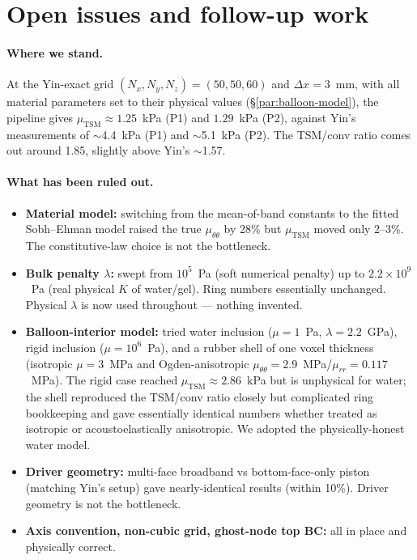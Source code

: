 \documentclass[11pt,letterpaper]{article}
\begin{document}
\section{Open issues and follow-up work}
\label{sec:openissues}

\paragraph{Where we stand.}
At the Yin-exact grid $(N_x, N_y, N_z) = (50, 50, 60)$ and
$\Delta x = 3$~mm, with all material parameters set to their
physical values (\S\ref{par:balloon-model}), the pipeline gives
$\mu_{\mathrm{TSM}} \approx 1.25$~kPa (P1) and $1.29$~kPa (P2),
against Yin's measurements of $\sim$4.4~kPa (P1) and $\sim$5.1~kPa
(P2). The TSM/conv ratio comes out around 1.85, slightly above
Yin's $\sim$1.57.

\paragraph{What has been ruled out.}
\begin{itemize}
\item \textbf{Material model:} switching from the mean-of-band constants
      to the fitted Sobh--Ehman model raised the true $\mu_{\theta\theta}$
      by 28\% but $\mu_{\mathrm{TSM}}$ moved only 2--3\%. The
      constitutive-law choice is not the bottleneck.
\item \textbf{Bulk penalty $\lambda$:} swept from $10^{5}$~Pa (soft
      numerical penalty) up to $2.2 \times 10^{9}$~Pa (real physical
      $K$ of water/gel). Ring numbers essentially unchanged. Physical
      $\lambda$ is now used throughout — nothing invented.
\item \textbf{Balloon-interior model:} tried water inclusion
      ($\mu = 1$~Pa, $\lambda = 2.2$~GPa), rigid inclusion
      ($\mu = 10^{6}$~Pa), and a rubber shell of one voxel thickness
      (isotropic $\mu = 3$~MPa and Ogden-anisotropic
      $\mu_{\theta\theta} = 2.9$~MPa/$\mu_{rr} = 0.117$~MPa). The rigid
      case reached $\mu_{\mathrm{TSM}} \approx 2.86$~kPa but is
      unphysical for water; the shell reproduced the TSM/conv ratio
      closely but complicated ring bookkeeping and gave essentially
      identical numbers whether treated as isotropic or acoustoelastically
      anisotropic. We adopted the physically-honest water model.
\item \textbf{Driver geometry:} multi-face broadband vs bottom-face-only
      piston (matching Yin's setup) gave nearly-identical results
      (within 10\%). Driver geometry is not the bottleneck.
\item \textbf{Axis convention, non-cubic grid, ghost-node top BC:}
      all in place and physically correct.
\end{itemize}
\end{document}
